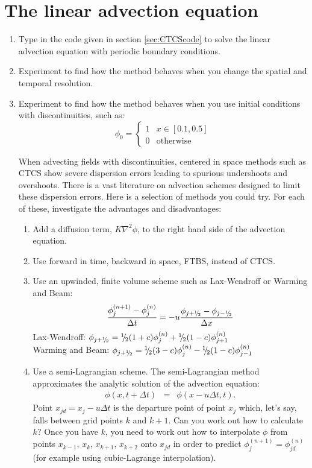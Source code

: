 \section{The linear advection equation}
\begin{enumerate}
\item Type in the code given in section \ref{sec:CTCScode} to solve the
linear advection equation with periodic boundary conditions.
\item Experiment to find how the method behaves when you change the spatial
and temporal resolution.
\item Experiment to find how the method behaves when you use initial conditions
with discontinuities, such as:
\[
\phi_{0}=\begin{cases}
1 & x\in\left[0.1,0.5\right]\\
0 & \text{otherwise}
\end{cases}
\]

When advecting fields with discontinuities, centered in space methods
such as CTCS show severe dispersion errors leading to spurious undershoots
and overshoots. There is a vast literature on advection schemes designed
to limit these dispersion errors. Here is a selection of methods you
could try. For each of these, investigate the advantages and disadvantages:
\begin{enumerate}
\item Add a diffusion term, $K\nabla^{2}\phi$, to the right hand side of
the advection equation.
\item Use forward in time, backward in space, FTBS, instead of CTCS.
\item Use an upwinded, finite volume scheme such as Lax-Wendroff or Warming
and Beam:
\[
\frac{\phi_{j}^{(n+1)}-\phi_{j}^{(n)}}{\Delta t}=-u\frac{\phi_{j+{^1\negthickspace/\negthinspace_2}}-\phi_{j-{^1\negthickspace/\negthinspace_2}}}{\Delta x}
\]
Lax-Wendroff: $\phi_{j+{^1\negthickspace/\negthinspace_2}}={^1\negthickspace/\negthinspace_2}(1+c)\phi_{j}^{(n)}+{^1\negthickspace/\negthinspace_2}(1-c)\phi_{j+1}^{(n)}$\\
Warming and Beam: $\phi_{j+{^1\negthickspace/\negthinspace_2}}={^1\negthickspace/\negthinspace_2}(3-c)\phi_{j}^{(n)}-{^1\negthickspace/\negthinspace_2}(1-c)\phi_{j-1}^{(n)}$
\item Use a semi-Lagrangian scheme. The semi-Lagrangian method approximates
the analytic solution of the advection equation:
\begin{eqnarray*}
\phi\left(x,t+\Delta t\right) & = & \phi\left(x-u\Delta t,t\right).
\end{eqnarray*}
Point $x_{jd}=x_{j}-u\Delta t$ is the departure point of point $x_{j}$
which, let's say, falls between grid points $k$ and $k+1$. Can you
work out how to calculate $k$? Once you have $k$, you need to work
out how to interpolate $\phi$ from points $x_{k-1}$, $x_{k}$, $x_{k+1}$,
$x_{k+2}$ onto $x_{jd}$ in order to predict $\phi_{j}^{(n+1)}=\phi_{jd}^{(n)}$
(for example using cubic-Lagrange interpolation).
\end{enumerate}
\end{enumerate}
\clearpage{}

